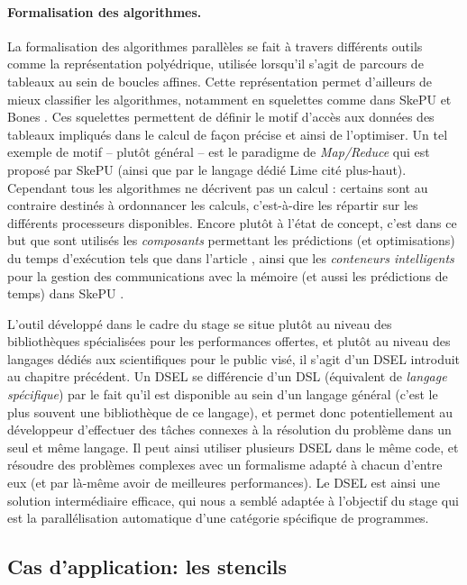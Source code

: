 \paragraph{Formalisation des algorithmes.}
La formalisation des algorithmes parallèles se fait à travers différents outils comme la représentation polyédrique, utilisée lorsqu'il s'agit de parcours de tableaux au sein de boucles affines. Cette représentation permet d'ailleurs de mieux classifier les algorithmes, notamment en squelettes comme dans \textsf{SkePU} et \textsf{Bones} \cite{Art4,Art3,Art9}. Ces squelettes permettent de définir le motif d'accès aux données des tableaux impliqués dans le calcul de façon précise et ainsi de l'optimiser. Un tel exemple de motif -- plutôt général -- est le paradigme de \emph{Map/Reduce} qui est proposé par \textsf{SkePU} (ainsi que par le langage dédié \textsf{Lime} cité plus-haut). Cependant tous les algorithmes ne décrivent pas un calcul : certains sont au contraire destinés à ordonnancer les calculs, c'est-à-dire les répartir sur les différents processeurs disponibles. Encore plutôt à l'état de concept, c'est dans ce but que sont utilisés les \emph{composants} permettant les prédictions (et optimisations) du temps d'exécution tels que dans l'article \cite{Art7}, ainsi que les \emph{conteneurs intelligents} pour la gestion des communications avec la mémoire (et aussi les prédictions de temps) dans \textsf{SkePU} \cite[p.~78]{Ths1}.


L'outil développé dans le cadre du stage se situe plutôt au niveau des bibliothèques spécialisées pour les performances offertes, et plutôt au niveau des langages dédiés aux scientifiques pour le public visé, il s'agit d'un DSEL introduit au chapitre précédent. Un DSEL se différencie d'un DSL (équivalent de \emph{langage spécifique}) par le fait qu'il est disponible au sein d'un langage général (c'est le plus souvent une bibliothèque de ce langage), et permet donc potentiellement au développeur d'effectuer des tâches connexes à la résolution du problème dans un seul et même langage. Il peut ainsi utiliser plusieurs DSEL dans le même code, et résoudre des problèmes complexes avec un formalisme adapté à chacun d'entre eux (et par là-même avoir de meilleures performances). Le DSEL est ainsi une solution intermédiaire efficace, qui nous a semblé adaptée à l'objectif du stage qui est la parallélisation automatique d'une catégorie spécifique de programmes. 


\subsection{Cas d'application: les stencils}
\label{sec:stencil_base}

